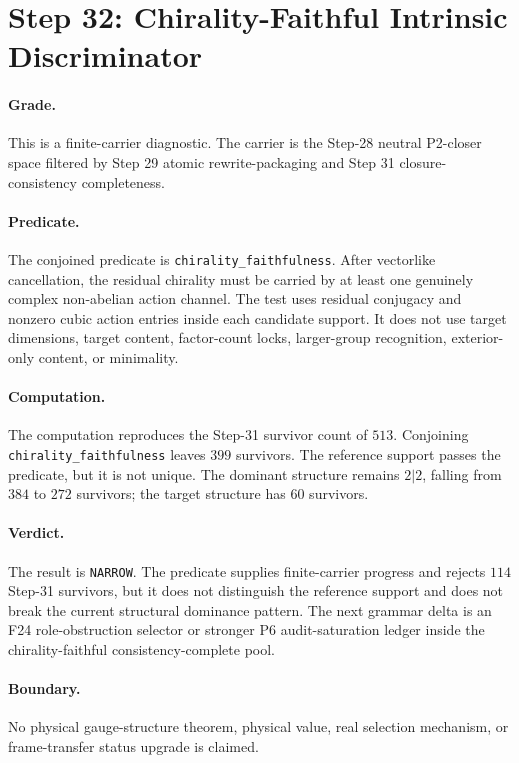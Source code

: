 \section{Step 32: Chirality-Faithful Intrinsic Discriminator}

\paragraph{Grade.}
This is a finite-carrier diagnostic.  The carrier is the Step-28 neutral P2-closer space filtered by Step 29 atomic rewrite-packaging and Step 31 closure-consistency completeness.

\paragraph{Predicate.}
The conjoined predicate is \texttt{chirality\_faithfulness}.  After vectorlike cancellation, the residual chirality must be carried by at least one genuinely complex non-abelian action channel.  The test uses residual conjugacy and nonzero cubic action entries inside each candidate support.  It does not use target dimensions, target content, factor-count locks, larger-group recognition, exterior-only content, or minimality.

\paragraph{Computation.}
The computation reproduces the Step-31 survivor count of \(513\).  Conjoining \texttt{chirality\_faithfulness} leaves \(399\) survivors.  The reference support passes the predicate, but it is not unique.  The dominant structure remains \(2|2\), falling from \(384\) to \(272\) survivors; the target structure has \(60\) survivors.

\paragraph{Verdict.}
The result is \texttt{NARROW}.  The predicate supplies finite-carrier progress and rejects \(114\) Step-31 survivors, but it does not distinguish the reference support and does not break the current structural dominance pattern.  The next grammar delta is an F24 role-obstruction selector or stronger P6 audit-saturation ledger inside the chirality-faithful consistency-complete pool.

\paragraph{Boundary.}
No physical gauge-structure theorem, physical value, real selection mechanism, or frame-transfer status upgrade is claimed.
